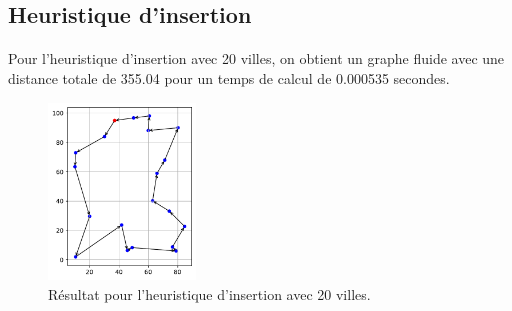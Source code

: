 \documentclass[a4paper,11pt,fleqn]{article}
\begin{document}
\subsection*{Heuristique d'insertion}
\paragraph{}
Pour l'heuristique d'insertion avec 20 villes, on obtient un graphe fluide avec une distance totale de 355.04 pour un temps de calcul de 0.000535 secondes.
\begin{figure}[H]
    \centering
    \includegraphics[width=0.35\textwidth]{images/insertion_20_villes.pdf}
    \caption{Résultat pour l'heuristique d'insertion avec 20 villes.}
    \label{fig:insert-20}
\end{figure}
\end{document}

